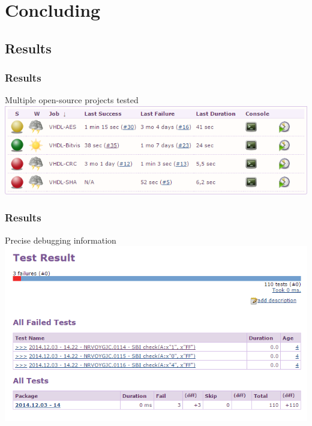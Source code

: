 \documentclass[british,10pt]{beamer}
\begin{document}

\section{Concluding}

\subsection{Results}
\begin{frame}\frametitle{Results}
Multiple open-source projects tested
\vskip10pt
{\centering
\includegraphics[width=\textwidth]{images/jobs.png}}
\end{frame}


\begin{frame}\frametitle{Results}
Precise debugging information
{\centering
\includegraphics[width=.95\textwidth]{images/results1.png}}
\end{frame}
%
\end{document}
